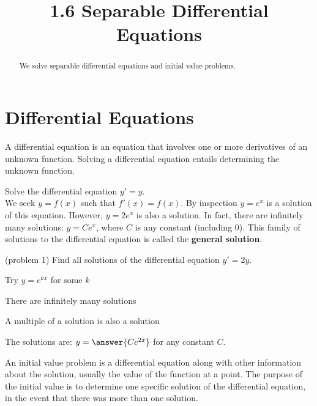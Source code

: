 \documentclass{ximera}
\title{1.6 Separable Differential Equations}
\begin{document}
\begin{abstract}
We solve separable differential equations and initial value problems.
\end{abstract}

\maketitle

\section{Differential Equations}

A differential equation is an equation that involves one or more derivatives of an unknown function. 
Solving a differential equation entails determining the unknown function.

\begin{example}[example 1]
Solve the differential equation $y' = y$.\\
We seek $y = f(x)$ such that $f'(x) = f(x)$. By inspection $y = e^x$ is a solution of this equation.
However, $y = 2e^x$ is also a solution. In fact, there are infinitely many solutions: $y = Ce^x$,
where $C$ is any constant (including 0). This family of solutions to the differential equation is called the 
\textbf{general solution}.
\end{example}



\begin{problem}(problem 1)
Find all solutions of the differential equation $y' = 2y$.\\
\begin{hint}
Try $y = e^{kx}$ for some $k$
\end{hint}
\begin{hint}
There are infinitely many solutions
\end{hint}
\begin{hint}
A multiple of a solution is also a solution
\end{hint}
The solutions are: \; $y = \answer{Ce^{2x}}$ \; for any constant $C$.
\end{problem}



An initial value problem is a differential equation along with other information about the solution, usually the value of the function at a point.
The purpose of the initial value is to determine one specific solution of the differential equation, in the event that there was more than one solution.
\end{document}
